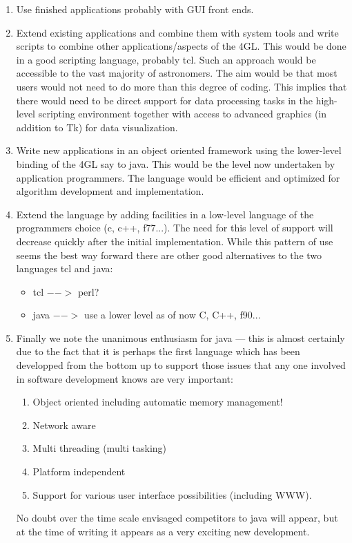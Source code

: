 \begin{enumerate}
\begin{enumerate}
\item Use finished applications probably with GUI front ends.

\item Extend existing applications and combine them with system tools
and write scripts to combine other applications/aspects of the 4GL.
This would be done in a good scripting language, probably tcl.  Such
an approach would be accessible to the vast majority of astronomers.
The aim would be that most users would not need to do more than this
degree of coding.  This implies that there would need to be direct
support for data processing tasks in the high-level scripting
environment together with access to advanced graphics (in addition to
Tk) for data visualization.

\item Write new applications in an object oriented framework using the
lower-level binding of the 4GL say to java.  This would be the level
now undertaken by application programmers.  The language would be
efficient and optimized for algorithm development and implementation.

\item Extend the language by adding facilities in a low-level language of
the programmers choice (c, c++, f77...).  The need for this level of
support will decrease quickly after the initial implementation.  While
this pattern of use seems the best way forward there are other good
alternatives to the two languages tcl and java:

\begin{itemize}
\item tcl $-->$ perl?
\item java $-->$ use a lower level as of now C, C++, f90...
\end{itemize}

\item Finally we note the unanimous enthusiasm for java --- this is almost
certainly due to the fact that it is perhaps the first language which
has been developped from the bottom up to support those issues that
any one involved in software development knows are very important:

\begin{enumerate}
\item Object oriented including automatic memory management!
\item Network aware
\item Multi threading (multi tasking)
\item Platform independent
\item Support for various user interface possibilities (including
WWW).
\end{enumerate}

No doubt over the time scale envisaged competitors to java will
appear, but at the time of writing it appears as a very exciting new
development.

\end{enumerate}
\end{enumerate}


